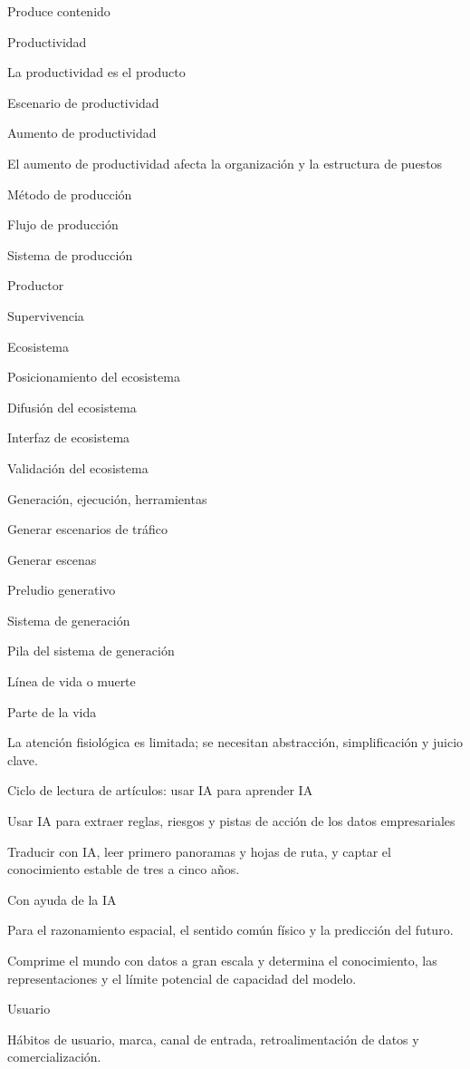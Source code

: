 \documentclass{article}
\begin{document}
Produce contenido

Productividad

La productividad es el producto

Escenario de productividad

Aumento de productividad

El aumento de productividad afecta la organización y la estructura de puestos

Método de producción

Flujo de producción

Sistema de producción

Productor

Supervivencia

Ecosistema

Posicionamiento del ecosistema

Difusión del ecosistema

Interfaz de ecosistema

Validación del ecosistema

Generación, ejecución, herramientas

Generar escenarios de tráfico

Generar escenas

Preludio generativo

Sistema de generación

Pila del sistema de generación

Línea de vida o muerte

Parte de la vida

La atención fisiológica es limitada; se necesitan abstracción, simplificación y juicio clave.

Ciclo de lectura de artículos: usar IA para aprender IA

Usar IA para extraer reglas, riesgos y pistas de acción de los datos empresariales

Traducir con IA, leer primero panoramas y hojas de ruta, y captar el conocimiento estable de tres a cinco años.

Con ayuda de la IA

Para el razonamiento espacial, el sentido común físico y la predicción del futuro.

Comprime el mundo con datos a gran escala y determina el conocimiento, las representaciones y el límite potencial de capacidad del modelo.

Usuario

Hábitos de usuario, marca, canal de entrada, retroalimentación de datos y comercialización.
\end{document}

